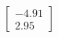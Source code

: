 \documentclass[preview]{standalone}
\begin{document}
\begin{align*}
\begin{bmatrix} -4.91 \\ 2.95 \end{bmatrix}
\end{align*}
\end{document}
